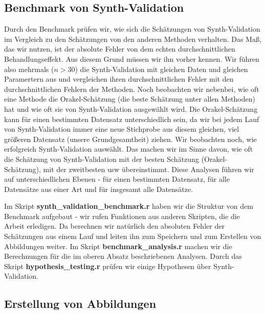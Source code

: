 \documentclass[12pt,a4paper,twoside]{scrartcl}
\numberwithin{equation}{section}
\begin{document}
  	\subsection{Benchmark von Synth-Validation}\label{subsec:benchmarkSynthValidation}
Durch den Benchmark prüfen wir, wie sich die Schätzungen von Synth-Validation im Vergleich zu den Schätzungen von den anderen Methoden verhalten. Das Maß, das wir nutzen, ist der absolute Fehler von dem echten durchschnittlichen Behandlungseffekt. Aus diesem Grund müssen wir ihn vorher kennen. Wir führen also mehrmals ($n>30$) die Synth-Validation mit gleichen Daten und gleichen Paramertern aus und vergleichen ihren durchschnittlichen Fehler mit den durchschnittlichen Fehlern der Methoden. Noch beobachten wir nebenbei, wie oft eine Methode die Orakel-Schätzung (die beste Schätzung unter allen Methoden) hat und wie oft sie von Synth-Validation ausgewählt wird. Die Orakel-Schätzung kann für einen bestimmten Datensatz unterschiedlich sein, da wir bei jedem Lauf von Synth-Validation immer eine neue Stichprobe aus diesem gleichen, viel größeren Datensatz (unsere Grundgesamtheit) ziehen. Wir beobachten noch, wie erfolgreich Synth-Validation auswählt. Das machen wir im Sinne davon, wie oft die Schätzung von Synth-Validation mit der besten Schätzung (Orakel-Schätzung), mit der zweitbesten usw übereinstimmt. Diese Analysen führen wir auf unterschiedlichen Ebenen - für einen bestimmten Datensatz, für alle Datensätze aus einer Art und für insgesamt alle Datensätze.\par 

\noindent
Im Skript \textbf{synth\_validation\_benchmark.r} haben wir die Struktur von dem Benchmark aufgebaut - wir rufen Funktionen aus anderen Skripten, die die Arbeit erledigen. Da berechnen wir natürlich den absoluten Fehler der Schätzungen aus einem Lauf und leiten ihn zum Speichern und zum Erstellen von Abbildungen weiter. Im Skript \textbf{benchmark\_analysis.r} machen wir die Berechnungen für die im oberen Absatz beschriebenen Analysen. Durch das Skript \textbf{hypothesis\_testing.r} prüfen wir einige Hypothesen über Synth-Validation. \par 

\subsection{Erstellung von Abbildungen}\label{subsec:erstellungAbbildungen}
\end{document}
